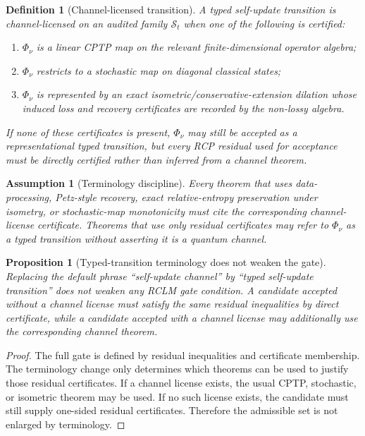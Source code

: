 \documentclass[11pt,a4paper]{article}
\newtheorem{proposition}[theorem]{Proposition}
\newtheorem{definition}[theorem]{Definition}
\newtheorem{assumption}[theorem]{Assumption}
\newcommand{\Scal}{\mathcal S}
\begin{document}
\begin{definition}[Channel-licensed transition]
\label{def:channel-licensed-transition}
A typed self-update transition is \emph{channel-licensed} on an audited family \(\Scal_t\) when one of the following is certified:
\begin{enumerate}[label=(\alph*),leftmargin=1.5em]
    \item \(\Phi_\nu\) is a linear CPTP map on the relevant finite-dimensional operator algebra;
    \item \(\Phi_\nu\) restricts to a stochastic map on diagonal classical states;
    \item \(\Phi_\nu\) is represented by an exact isometric/conservative-extension dilation whose induced loss and recovery certificates are recorded by the non-lossy algebra.
\end{enumerate}
If none of these certificates is present, \(\Phi_\nu\) may still be accepted as a representational typed transition, but every RCP residual used for acceptance must be directly certified rather than inferred from a channel theorem.
\end{definition}

\begin{assumption}[Terminology discipline]
\label{ass:terminology-discipline}
Every theorem that uses data-processing, Petz-style recovery, exact relative-entropy preservation under isometry, or stochastic-map monotonicity must cite the corresponding channel-license certificate.  Theorems that use only residual certificates may refer to \(\Phi_\nu\) as a typed transition without asserting it is a quantum channel.
\end{assumption}

\begin{proposition}[Typed-transition terminology does not weaken the gate]
\label{prop:typed-transition-no-weakening}
Replacing the default phrase ``self-update channel'' by ``typed self-update transition'' does not weaken any RCLM gate condition.  A candidate accepted without a channel license must satisfy the same residual inequalities by direct certificate, while a candidate accepted with a channel license may additionally use the corresponding channel theorem.
\end{proposition}

\begin{proof}
The full gate is defined by residual inequalities and certificate membership.  The terminology change only determines which theorems can be used to justify those residual certificates.  If a channel license exists, the usual CPTP, stochastic, or isometric theorem may be used.  If no such license exists, the candidate must still supply one-sided residual certificates.  Therefore the admissible set is not enlarged by terminology.
\end{proof}
\end{document}
